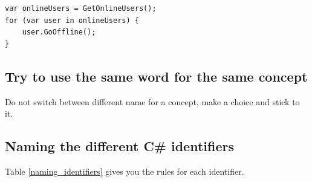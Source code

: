 \documentclass[11pt,a4paper]{article}
\begin{document}
\begin{lstlisting}[language={[Sharp]C}, caption={Correct usage of plural}]
var onlineUsers = GetOnlineUsers();
for (var user in onlineUsers) {
    user.GoOffline();
}
\end{lstlisting}

\subsection{Try to use the same word for the same concept}

Do not switch between different name for a concept, make a choice and stick to it.

\subsection{Naming the different C\# identifiers }

Table \ref{naming_identifiers} gives you the rules for each identifier.
\end{document}
